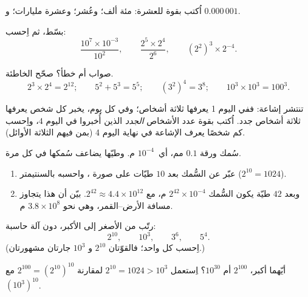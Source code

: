\begin{exercise}[$\star$]\label{exo:g8:powers:5}
اُكتب بقوة للعشرة: مئة ألف؛ وعُشر؛ وعشرة
مليارات؛ و $0.000\,001$.
\end{exercise}

\begin{exercise}[$\star$]\label{exo:g8:powers:6}
بسّط، ثم اِحسب:
\[
\frac{10^7 \times 10^{-3}}{10^2},
\qquad
\frac{2^5 \times 2^4}{2^6},
\qquad
\left(2^2\right)^3 \times 2^{-4} .
\]
\end{exercise}

\begin{exercise}[$\star$]\label{exo:g8:powers:7}
صواب أم خطأ؟ صحّح الخاطئة.
\[
2^3 \times 2^4 = 2^{12}; \qquad
5^2 + 5^3 = 5^5; \qquad
(3^2)^4 = 3^8; \qquad
10^3 \times 10^3 = 100^3 .
\]
\end{exercise}

\begin{exercise}[$\star\star$]\label{exo:g8:powers:8}
تنتشر إشاعة: ففي اليوم 1 يعرفها ثلاثة أشخاص؛ وفي كل يوم، يخبر كل
شخص يعرفها ثلاثة أشخاص جدد. اُكتب بقوة عدد
الأشخاص \emph{الجدد} الذين أُخبروا في اليوم $4$، واِحسب كم شخصًا
يعرف الإشاعة في نهاية اليوم 4 (بمن فيهم الثلاثة الأوائل).
\end{exercise}

\begin{exercise}[$\star\star$]\label{exo:g8:powers:9}
سُمك ورقة $0.1$ مم، أي\ $10^{-4}$ م. وطيّها
يضاعف سُمكها في كل مرة.
\begin{enumerate}
  \item عبّر عن السُّمك بعد $10$ طيّات على صورة ،
        واحسبه بالسنتيمتر ($2^{10} = 1024$).
  \item وبعد $42$ طيّة يكون السُّمك
        $2^{42} \times 10^{-4}$ م، مع $2^{42} \approx 4.4 \times
        10^{12}$. بيّن أن هذا يتجاوز مسافة الأرض--القمر،
        وهي نحو $3.8 \times 10^8$ م.
\end{enumerate}
\end{exercise}

\begin{exercise}[$\star\star$]\label{exo:g8:powers:10}
رتّب من الأصغر إلى الأكبر، دون آلة حاسبة:
\[
2^{10}, \qquad 10^3, \qquad 3^6, \qquad 5^4 .
\]
(اِحسب كل واحد؛ فالقوّتان $2^{10}$ و $10^3$ جارتان مشهورتان.)
\end{exercise}

\begin{exercise}[$\star\star\star$]\label{exo:g8:powers:11}
أيّهما أكبر، $2^{100}$ أم $10^{30}$؟ اِستعمل
$2^{10} = 1024 > 10^3$ لمقارنة
$2^{100} = \left(2^{10}\right)^{10}$ مع
$\left(10^3\right)^{10}$.
\end{exercise}

